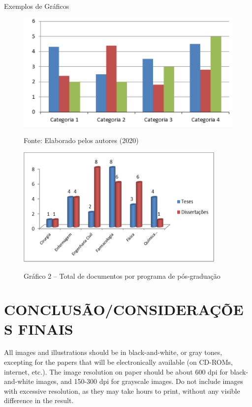 \documentclass[12pt]{article}
\begin{document}
Exemplos de Gráficos
\begin{figure}[H]
\centering
\caption{Fonte: Elaborado pelos autores (2020)}
\includegraphics[width=15.0cm]{Fig/graf1.PNG}
{\footnotesize{}} 
\label{graf1}
\end{figure}

\begin{figure}[H]
\centering
\caption{Gráfico 2 – Total de documentos por programa de pós-graduação } %
\includegraphics{Fig/grafico2.PNG}
{\footnotesize{}}
\label{graf2}
\end{figure}


\section{CONCLUSÃO/CONSIDERAÇÕES FINAIS}
\label{Conclusão}

All images and illustrations should be in black-and-white, or gray tones,
excepting for the papers that will be electronically available (on CD-ROMs, internet, etc.). The image resolution on paper should be about 600 dpi for black-and-white images, and 150-300 dpi for grayscale images.  Do not include images with excessive resolution, as they may take hours to print, without any visible difference in the result. 
\end{document}
